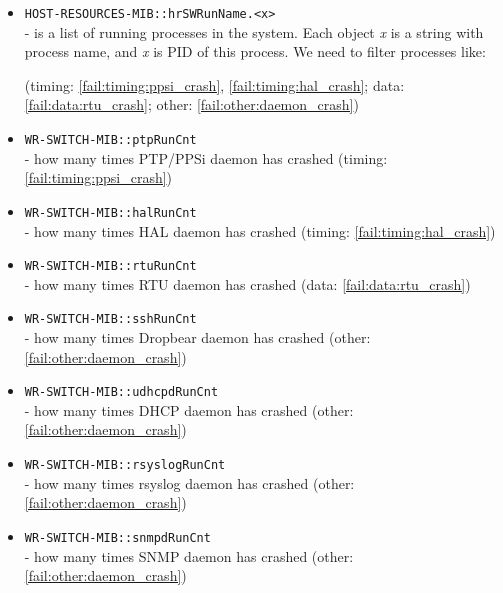 \begin{itemize}[leftmargin=0pt]
	\item [] \texttt{HOST-RESOURCES-MIB::hrSWRunName.<x>}\\ - is a list of running
		processes in the system. Each object \emph{x} is a string with process name,
		and \emph{x} is PID of this process. We need to filter processes like:
		\vspace{12pt}
		(timing: \ref{fail:timing:ppsi_crash}, \ref{fail:timing:hal_crash}; data:
		\ref{fail:data:rtu_crash}; other: \ref{fail:other:daemon_crash})
	\item [] \texttt{WR-SWITCH-MIB::ptpRunCnt}\\ - how many times PTP/PPSi daemon
		has crashed (timing: \ref{fail:timing:ppsi_crash})
	\item [] \texttt{WR-SWITCH-MIB::halRunCnt}\\ - how many times HAL daemon
		has crashed (timing: \ref{fail:timing:hal_crash})
	\item [] \texttt{WR-SWITCH-MIB::rtuRunCnt}\\ - how many times RTU daemon
		has crashed (data: \ref{fail:data:rtu_crash})
	\item [] \texttt{WR-SWITCH-MIB::sshRunCnt}\\ - how many times Dropbear
		daemon has crashed (other: \ref{fail:other:daemon_crash})
	\item [] \texttt{WR-SWITCH-MIB::udhcpdRunCnt}\\ - how many times DHCP daemon
		has crashed (other: \ref{fail:other:daemon_crash})
	\item [] \texttt{WR-SWITCH-MIB::rsyslogRunCnt}\\ - how many times rsyslog
		daemon has crashed (other: \ref{fail:other:daemon_crash})
	\item [] \texttt{WR-SWITCH-MIB::snmpdRunCnt}\\ - how many times SNMP daemon
		has crashed (other: \ref{fail:other:daemon_crash})

\end{itemize}
